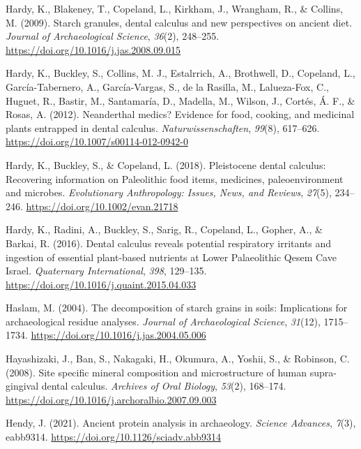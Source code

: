 \documentclass[
  letterpaper,
]{book}
\newlength{\cslhangindent}
\newlength{\cslentryspacingunit} %
\newenvironment{CSLReferences}[2] %
 {%
  \setlength{\parindent}{0pt}
  \ifodd #1
  \let\oldpar\par
  \def\par{\hangindent=\cslhangindent\oldpar}
  \fi
  \setlength{\parskip}{#2\cslentryspacingunit}
 }%
 {}
\begin{document}
\begin{CSLReferences}{1}{0}
\leavevmode{}%
Hardy, K., Blakeney, T., Copeland, L., Kirkham, J., Wrangham, R., \&
Collins, M. (2009). Starch granules, dental calculus and new
perspectives on ancient diet. \emph{Journal of Archaeological Science},
\emph{36}(2), 248--255. \url{https://doi.org/10.1016/j.jas.2008.09.015}

\leavevmode{}%
Hardy, K., Buckley, S., Collins, M. J., Estalrrich, A., Brothwell, D.,
Copeland, L., García-Tabernero, A., García-Vargas, S., de la Rasilla,
M., Lalueza-Fox, C., Huguet, R., Bastir, M., Santamaría, D., Madella,
M., Wilson, J., Cortés, Á. F., \& Rosas, A. (2012). Neanderthal medics?
{Evidence} for food, cooking, and medicinal plants entrapped in dental
calculus. \emph{Naturwissenschaften}, \emph{99}(8), 617--626.
\url{https://doi.org/10.1007/s00114-012-0942-0}

\leavevmode{}%
Hardy, K., Buckley, S., \& Copeland, L. (2018). Pleistocene dental
calculus: {Recovering} information on {Paleolithic} food items,
medicines, paleoenvironment and microbes. \emph{Evolutionary
Anthropology: Issues, News, and Reviews}, \emph{27}(5), 234--246.
\url{https://doi.org/10.1002/evan.21718}

\leavevmode{}%
Hardy, K., Radini, A., Buckley, S., Sarig, R., Copeland, L., Gopher, A.,
\& Barkai, R. (2016). Dental calculus reveals potential respiratory
irritants and ingestion of essential plant-based nutrients at {Lower
Palaeolithic Qesem Cave Israel}. \emph{Quaternary International},
\emph{398}, 129--135. \url{https://doi.org/10.1016/j.quaint.2015.04.033}

\leavevmode{}%
Haslam, M. (2004). The decomposition of starch grains in soils:
Implications for archaeological residue analyses. \emph{Journal of
Archaeological Science}, \emph{31}(12), 1715--1734.
\url{https://doi.org/10.1016/j.jas.2004.05.006}

\leavevmode{}%
Hayashizaki, J., Ban, S., Nakagaki, H., Okumura, A., Yoshii, S., \&
Robinson, C. (2008). Site specific mineral composition and
microstructure of human supra-gingival dental calculus. \emph{Archives
of Oral Biology}, \emph{53}(2), 168--174.
\url{https://doi.org/10.1016/j.archoralbio.2007.09.003}

\leavevmode{}%
Hendy, J. (2021). Ancient protein analysis in archaeology. \emph{Science
Advances}, \emph{7}(3), eabb9314.
\url{https://doi.org/10.1126/sciadv.abb9314}


\end{CSLReferences}
\end{document}
